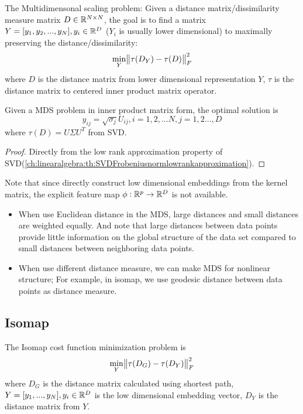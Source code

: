 \begin{refsection}
\begin{definition}
The Multidimensonal scaling problem:
Given a distance matrix/dissimilarity measure matrix $D\in \mathbb{R}^{N\times N}$, the goal is to find a matrix $Y=[y_1,y_2,...,y_N], y_i\in \mathbb{R}^D$ ($Y_i$ is usually lower dimensional) to maximally preserving the distance/dissimilarity:
$$\min_{Y} \norm{\tau(D_Y) - \tau(D)}_F^2$$
where $D$ is the distance matrix from lower dimensional representation $Y$, $\tau$ is the distance matrix to centered inner product matrix operator.
\end{definition}


\begin{theorem}
Given a MDS problem in inner product matrix form, the optimal solution is $$y_{ij} = \sqrt{\sigma_j}U_{ij},i=1,2,...N,j=1,2...,D$$
where $\tau(D) = U\Sigma U^T$ from SVD.
\end{theorem}
\begin{proof}
Directly from the low rank approximation property of SVD(\autoref{ch:linearalgebra:th:SVDFrobeniusnormlowrankapproximation}).
\end{proof}


\begin{remark}
Note that since directly construct low dimensional embeddings from the kernel matrix, the explicit feature map $\phi: \mathbb{R}^p \to \mathbb{R}^D $ is not available.
\end{remark}

\begin{remark}\hfill
\begin{itemize}
\item When use Euclidean distance in the MDS, large distances and small distances are weighted equally. And note that large distances between data points provide little information on the global structure of the data set compared to small distances between neighboring data points. 
\item When use different distance measure, we can make MDS for nonlinear structure; For example, in isomap, we use geodesic distance between data points as distance measure. 
\end{itemize}
\end{remark}


\subsection{Isomap}
\begin{definition}\cite{tenenbaum2000global}\label{}
The Isomap cost function minimization problem is
$$\min_{Y} \norm{\tau(D_G) - \tau(D_Y)}^2_F$$
where $D_G$ is the distance matrix calculated using shortest path, $Y = [y_1,...,y_N],y_i\in \mathbb{R}^D$ is the low dimensional embedding vector, $D_Y$ is the distance matrix from $Y$.
\end{definition}



\end{refsection}
